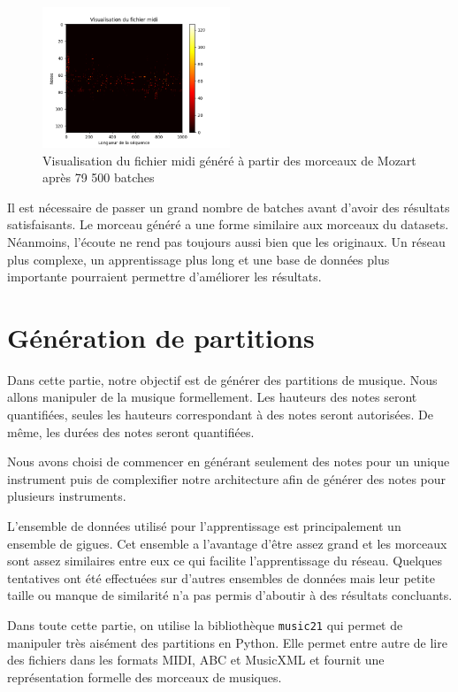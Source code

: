 \begin{figure}[!h]
  \centering
  \includegraphics[width=0.5\textwidth]{images/chapter9/midi_generated_mozart_79500.png}
  \caption{Visualisation du fichier midi généré à partir des morceaux de Mozart après 79 500 batches}
  \label{midi_generated_mozart}
\end{figure}

Il est nécessaire de passer un grand nombre de batches avant d'avoir des résultats satisfaisants. Le morceau généré a une forme similaire aux morceaux du datasets. Néanmoins, l'écoute ne rend pas toujours aussi bien que les originaux. Un réseau plus complexe, un apprentissage plus long et une base de données plus importante pourraient permettre d'améliorer les résultats.


\section{Génération de partitions}

Dans cette partie, notre objectif est de générer des partitions de musique. Nous allons manipuler de la musique formellement. Les hauteurs des notes seront quantifiées, seules les hauteurs correspondant à des notes seront autorisées. De même, les durées des notes seront quantifiées.

Nous avons choisi de commencer en générant seulement des notes pour un unique instrument puis de complexifier notre architecture afin de générer des notes pour plusieurs instruments.

L'ensemble de données utilisé pour l'apprentissage est principalement un ensemble de gigues. Cet ensemble a l'avantage d'être assez grand et les morceaux sont assez similaires entre eux ce qui facilite l'apprentissage du réseau. Quelques tentatives ont été effectuées sur d'autres ensembles de données mais leur petite taille ou manque de similarité n'a pas permis d'aboutir à des résultats concluants.

Dans toute cette partie, on utilise la bibliothèque \texttt{music21} qui permet de manipuler très aisément des partitions en Python. Elle permet entre autre de lire des fichiers dans les formats MIDI, ABC et MusicXML et fournit une représentation formelle des morceaux de musiques.


